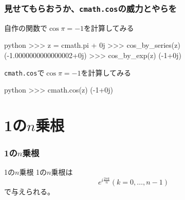 \documentclass[dvipdfmx,11pt,notheorems]{beamer}
\theoremstyle{definition}
\begin{document}
\begin{frame}[fragile]\frametitle{見せてもらおうか、\texttt{cmath.cos}の威力とやらを}
\begin{exampleblock}{自作の関数で$\cos{\pi} = -1$を計算してみる}
\begin{pygments}{python}
>>> z = cmath.pi + 0j
>>> cos_by_series(z)
(-1.0000000000000002+0j)
>>> cos_by_exp(z)
(-1+0j)
\end{pygments}
\end{exampleblock}

\begin{exampleblock}{\texttt{cmath.cos}で$\cos{\pi} = -1$を計算してみる}
\begin{pygments}{python}
>>> cmath.cos(z)
(-1+0j)
\end{pygments}
\end{exampleblock}

\end{frame}

%
%
%
%
%
%

\section{1の$n$乗根}

\begin{frame}[fragile]\frametitle{1の$n$乗根}

\begin{block}{1の$n$乗根}
1の$n$乗根は
\begin{equation*}
e^{i \frac{2\pi k}{n}}(k=0, \dots , n-1)
\end{equation*}
で与えられる。
\end{block}

\end{frame}
\end{document}
